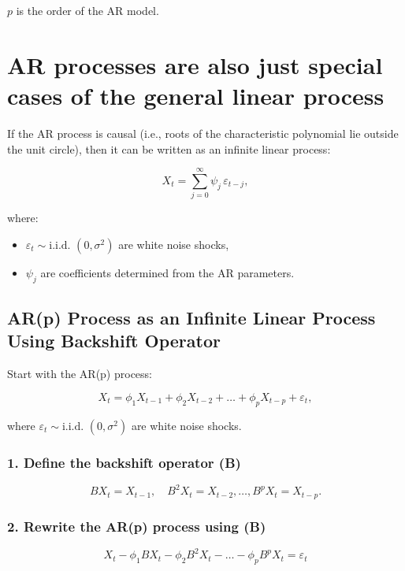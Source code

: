 \documentclass[
  11pt,
  a4paper,
]{report}
\begin{document}
\(p\) is the order of the AR model.

\section{AR processes are also just special cases of the general linear
process}\label{ar-processes-are-also-just-special-cases-of-the-general-linear-process}

If the AR process is causal (i.e., roots of the characteristic
polynomial lie outside the unit circle), then it can be written as an
infinite linear process:

\[X_t = \sum_{j=0}^{\infty} \psi_j \, \varepsilon_{t-j},\]

where:

\begin{itemize}
\item
  \(\varepsilon_t \sim \text{i.i.d. }(0, \sigma^2)\) are white noise
  shocks,
\item
  \(\psi_j\) are coefficients determined from the AR parameters.
\end{itemize}

\subsection{AR(p) Process as an Infinite Linear Process Using Backshift
Operator}\label{arp-process-as-an-infinite-linear-process-using-backshift-operator}

Start with the AR(p) process:

\[X_t = \phi_1 X_{t-1} + \phi_2 X_{t-2} + \dots + \phi_p X_{t-p} + \varepsilon_t,\]

where \(\varepsilon_t \sim \text{i.i.d. }(0, \sigma^2)\) are white noise
shocks.

\subsubsection{1. Define the backshift operator
(B)}\label{define-the-backshift-operator-b}

\[B X_t = X_{t-1}, \quad B^2 X_t = X_{t-2}, \dots, B^p X_t = X_{t-p}.\]

\subsubsection{2. Rewrite the AR(p) process using
(B)}\label{rewrite-the-arp-process-using-b}

\[X_t - \phi_1 B X_t - \phi_2 B^2 X_t - \dots - \phi_p B^p X_t = \varepsilon_t\]
\end{document}
